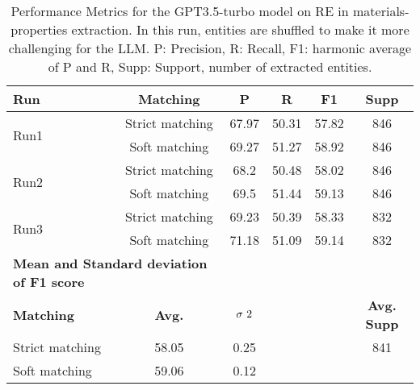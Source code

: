 \begin{table}[htbp]
    \small
    \centering
    \caption{Performance Metrics for the GPT3.5-turbo model on RE in materials-properties extraction. In this run, entities are shuffled to make it more challenging for the LLM. P: Precision, R: Recall, F1: harmonic average of P and R, Supp: Support, number of extracted entities.}
    \begin{tabular}{lccccc}
        \toprule
        \textbf{Run} & \textbf{Matching} & \textbf{P} & \textbf{R} & \textbf{F1} & \textbf{Supp} \\
        \midrule
        \multirow{2}{*}{Run1} & Strict matching & 67.97 & 50.31 & 57.82 & 846 \\
        & Soft matching & 69.27 & 51.27 & 58.92 & 846 \\
        \midrule
        \multirow{2}{*}{Run2} & Strict matching & 68.2 & 50.48 & 58.02 & 846 \\
        & Soft matching & 69.5 & 51.44 & 59.13 & 846 \\
        \midrule
        \multirow{2}{*}{Run3} & Strict matching & 69.23 & 50.39 & 58.33 & 832 \\
        & Soft matching & 71.18 & 51.09 & 59.14 & 832 \\
        \midrule
        \multicolumn{2}{l}{\textbf{Mean and Standard deviation of F1 score}} & & & & \\
        \midrule
        \textbf{Matching} & \textbf{Avg.} & $\sigma\textsuperscript{2}$ & & & \textbf{Avg. Supp}\\
        Strict matching & 58.05 & 0.25 & & & 841 \\
        Soft matching & 59.06 & 0.12 & & & \\
        \bottomrule
    \end{tabular}
\end{table}


